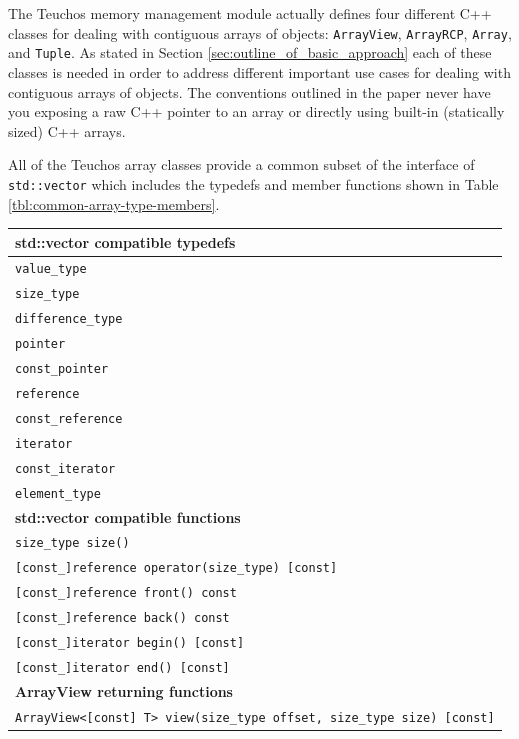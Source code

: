 \documentclass[pdf,ps2pdf,11pt]{SANDreport}
\begin{document}
The Teuchos memory management module actually defines four different
C++ classes for dealing with contiguous arrays of objects:
{}\texttt{ArrayView}, {}\texttt{ArrayRCP}, {}\texttt{Array}, and
{}\texttt{Tuple}.  As stated in Section
{}\ref{sec:outline_of_basic_approach} each of these classes is needed
in order to address different important use cases for dealing with
contiguous arrays of objects.  The conventions outlined in the paper
never have you exposing a raw C++ pointer to an array or directly
using built-in (statically sized) C++ arrays.

All of the Teuchos array classes provide a common subset of the
interface of {}\texttt{std::vector} which includes the typedefs and
member functions shown in Table {}\ref{tbl:common-array-type-members}.

\begin{table}
{\small\begin{center}
\begin{tabular}{|l|}
\hline
{}\textbf{std::vector compatible typedefs} \\
\hline
{}\texttt{value\_type} \\
{}\texttt{size\_type} \\
{}\texttt{difference\_type} \\
{}\texttt{pointer} \\
{}\texttt{const\_pointer} \\
{}\texttt{reference} \\
{}\texttt{const\_reference} \\
{}\texttt{iterator} \\
{}\texttt{const\_iterator} \\
{}\texttt{element\_type} \\
\hline
{}\textbf{std::vector compatible functions} \\
\hline
{}\texttt{size\_type size()} \\
{}\texttt{[const\_]reference operator{}(size\_type) [const]} \\
{}\texttt{[const\_]reference front() const} \\
{}\texttt{[const\_]reference back() const} \\
{}\texttt{[const\_]iterator begin() [const]} \\
{}\texttt{[const\_]iterator end() [const]} \\
\hline
{}\textbf{ArrayView returning functions} \\
\hline
{}\texttt{ArrayView<[const] T> view(size\_type offset, size\_type size) [const]} \\

\end{tabular}
\end{center}}
\end{table}
\end{document}
